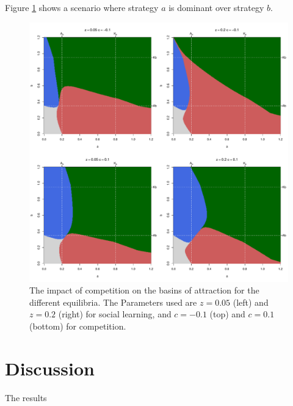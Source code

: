 \documentclass[preprint,authoryear]{elsarticle}
\begin{document}
Figure \ref{fig:competition} shows a scenario where strategy $a$ is dominant over strategy $b$.

\begin{figure}[h!]
  \centering
      \includegraphics[width=\textwidth]{./figures/figure7}
  \caption{The impact of competition on the basins of attraction for the different equilibria. The Parameters used are $z=0.05$ (left) and $z=0.2$ (right) for social learning, and $c=-0.1$ (top) and $c=0.1$ (bottom) for competition.}
    \label{fig:competition}
\end{figure}


\section{Discussion}

The results 





\end{document}
